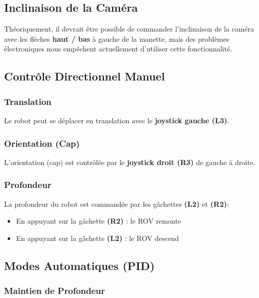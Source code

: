 \begin{appendices}
\subsection{Inclinaison de la Caméra}

Théoriquement, il devrait être possible de commander l'inclinaison de la caméra avec les flèches \textbf{haut / bas} à gauche de la manette, mais des problèmes électroniques nous empêchent actuellement d'utiliser cette fonctionnalité.

\subsection{Contrôle Directionnel Manuel}

\subsubsection{Translation}

Le robot peut se déplacer en translation avec le \textbf{joystick gauche (L3)}.

\subsubsection{Orientation (Cap)}

L'orientation (cap) est contrôlée par le \textbf{joystick droit (R3)} de gauche à droite.

\subsubsection{Profondeur}

La profondeur du robot est commandée par les gâchettes \textbf{(L2)} et \textbf{(R2)}:
\begin{itemize}
    \item En appuyant sur la gâchette \textbf{(R2)} : le ROV remonte
    \item En appuyant sur la gâchette \textbf{(L2)} : le ROV descend
\end{itemize}

\subsection{Modes Automatiques (PID)}

\subsubsection{Maintien de Profondeur}


\end{appendices}
